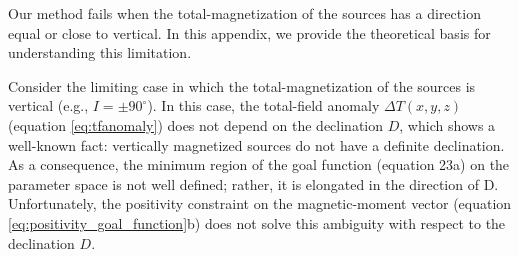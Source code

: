 \label{append:vertical-magnetization}

Our method fails when the total-magnetization of the sources 
has a direction equal or close to vertical. In this appendix, we provide the theoretical basis for 
understanding this limitation.

Consider the limiting case in which the total-magnetization of the sources is vertical 
(e.g., $I = \pm 90^\circ$). In this case, the total-field anomaly $\Delta T(x, y, z)$ 
(equation \ref{eq:tfanomaly}) does not depend on the declination $D$, which shows a 
well-known fact: vertically magnetized sources do not have a definite declination.
As a consequence, the minimum region of the goal function (equation 23a) on the parameter 
space is not well defined; rather, it is  elongated in the direction of D. 
Unfortunately, the positivity constraint on the magnetic-moment
vector (equation \ref{eq:positivity_goal_function}b) does not solve this ambiguity with 
respect to the declination $D$.

